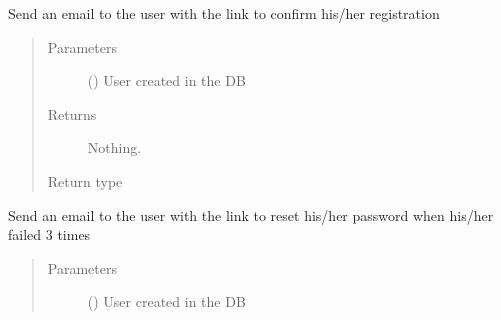 \documentclass[letterpaper,10pt,english]{sphinxmanual}
\begin{document}
\begin{fulllineitems}
\label{\detokenize{CE_app.auth:CE_app.auth.email.send_confirm_register}}
\sphinxAtStartPar
Send an email to the user with the link to confirm his/her registration
\begin{quote}\begin{description}
\item[{Parameters}] \leavevmode
\sphinxAtStartPar
{} ({\hyperref[\detokenize{CE_app:CE_app.models.User}]{}}) \textendash{} User created in the DB

\item[{Returns}] \leavevmode
\sphinxAtStartPar
Nothing.

\item[{Return type}] \leavevmode
\sphinxAtStartPar


\end{description}\end{quote}

\end{fulllineitems}


\begin{fulllineitems}
\label{\detokenize{CE_app.auth:CE_app.auth.email.send_forgotten_password_reset_email}}
\sphinxAtStartPar
Send an email to the user with the link to reset his/her password when his/her failed 3 times
\begin{quote}\begin{description}
\item[{Parameters}] \leavevmode
\sphinxAtStartPar
{} ({\hyperref[\detokenize{CE_app:CE_app.models.User}]{}}) \textendash{} User created in the DB

\end{description}\end{quote}

\end{fulllineitems}
\end{document}
